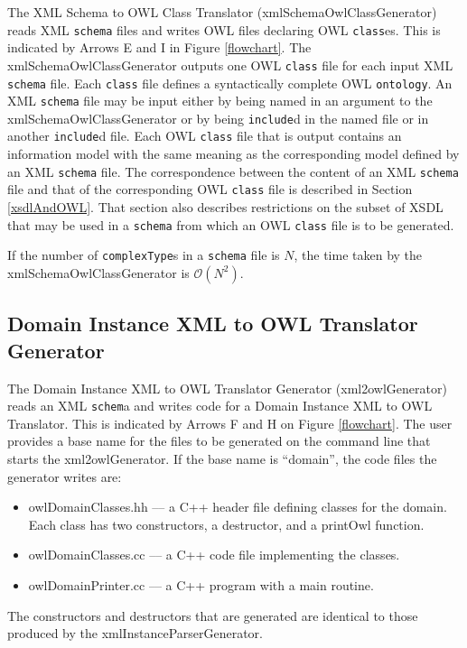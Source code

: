 \documentclass[preprint,12pt]{elsarticle}
\begin{document}
The XML Schema to OWL Class Translator (xmlSchemaOwlClassGenerator) reads
XML {\tt schema} files and writes OWL files declaring OWL {\tt class}es.
This is indicated by Arrows E and I in Figure \ref{flowchart}. The
xmlSchemaOwlClassGenerator outputs one OWL {\tt class} file for each input
XML {\tt schema} file. Each {\tt class} file defines a syntactically
complete OWL {\tt ontology}. An XML {\tt schema} file may be input either
by being named in an argument to the xmlSchemaOwlClassGenerator or by being
{\tt include}d in the named file or in another {\tt include}d file. Each
OWL {\tt class} file that is output contains an information model with the
same meaning as the corresponding model defined by an XML {\tt schema}
file. The correspondence between the content of an XML {\tt schema} file
and that of the corresponding OWL {\tt class} file is described in Section
\ref{xsdlAndOWL}. That section also describes restrictions on
the subset of XSDL that may be used in a {\tt schema} from which an OWL
{\tt class} file is to be generated.

If the number of {\tt complexType}s in a {\tt schema} file is ${N}$, the
time taken by the xmlSchemaOwlClassGenerator is $\mathcal{O}{(N^2)}$.

\subsection{Domain Instance XML to OWL Translator Generator}
\label{instanceToOWL}

The Domain Instance XML to OWL Translator Generator (xml2owlGenerator)
reads an XML {\tt schem}a and writes code for a Domain Instance XML to OWL
Translator. This is indicated by Arrows F and H on Figure \ref{flowchart}.
The user provides a base name for the files to be generated on the command
line that starts the xml2owlGenerator. If the base name is ``domain'', the
code files the generator writes are:

\begin{itemize}
\item[] owlDomainClasses.hh --– a C++ header file defining classes
     for the domain. Each class has two constructors, a
     destructor,  and a printOwl function. 
\item[] owlDomainClasses.cc –-- a C++ code file implementing the
      classes.
\item[] owlDomainPrinter.cc --– a C++ program with a main routine. 
\end{itemize}

The constructors and destructors that are generated are identical to those
produced by the xmlInstanceParserGenerator.
\end{document}
